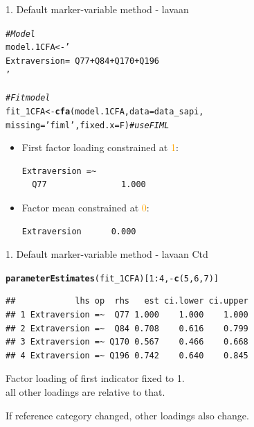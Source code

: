 \documentclass[10pt]{beamer}\usepackage[]{graphicx}\usepackage[]{xcolor}
\makeatletter
\newcommand{\hlnum}[1]{\textcolor[rgb]{0.686,0.059,0.569}{#1}}%
\newcommand{\hlstr}[1]{\textcolor[rgb]{0.192,0.494,0.8}{#1}}%
\newcommand{\hlcom}[1]{\textcolor[rgb]{0.678,0.584,0.686}{\textit{#1}}}%
\newcommand{\hlopt}[1]{\textcolor[rgb]{0,0,0}{#1}}%
\newcommand{\hlstd}[1]{\textcolor[rgb]{0.345,0.345,0.345}{#1}}%
\newcommand{\hlkwb}[1]{\textcolor[rgb]{0.69,0.353,0.396}{#1}}%
\newcommand{\hlkwc}[1]{\textcolor[rgb]{0.333,0.667,0.333}{#1}}%
\newcommand{\hlkwd}[1]{\textcolor[rgb]{0.737,0.353,0.396}{\textbf{#1}}}%
\newenvironment{kframe}{%
 \def\at@end@of@kframe{}%
 \ifinner\ifhmode%
  \def\at@end@of@kframe{\end{minipage}}%
  \begin{minipage}{\columnwidth}%
 \fi\fi%
 \def\FrameCommand##1{\hskip\@totalleftmargin \hskip-\fboxsep
 \colorbox{shadecolor}{##1}\hskip-\fboxsep
     \hskip-\linewidth \hskip-\@totalleftmargin \hskip\columnwidth}%
 \MakeFramed {\advance\hsize-\width
   \@totalleftmargin\z@ \linewidth\hsize
   \@setminipage}}%
 {\par\unskip\endMakeFramed%
 \at@end@of@kframe}
\newenvironment{knitrout}{}{} %
\makeatother
\begin{document}
\begin{frame}[fragile]{1. Default marker-variable method - lavaan}

\begin{knitrout}
\color{fgcolor}\begin{kframe}
\begin{alltt}
\hlcom{# Model}
\hlstd{model.1CFA} \hlkwb{<-} \hlstr{'
 Extraversion =~ Q77 + Q84 + Q170 + Q196
'}

\hlcom{# Fit model}
\hlstd{fit_1CFA} \hlkwb{<-} \hlkwd{cfa}\hlstd{(model.1CFA,} \hlkwc{data}\hlstd{=data_sapi,}
                \hlkwc{missing}\hlstd{=}\hlstr{'fiml'}\hlstd{,} \hlkwc{fixed.x}\hlstd{=F)}  \hlcom{# use FIML}
\end{alltt}
\end{kframe}
\end{knitrout}

\begin{itemize}
    \item First factor loading constrained at \textcolor{orange}{1}:\\
\begin{verbatim}
Extraversion =~                                     
  Q77               1.000
\end{verbatim}
    \item Factor mean constrained at \textcolor{orange}{0}:\\
\begin{verbatim}
Extraversion      0.000
\end{verbatim}
\end{itemize} 

\end{frame}
%
\begin{frame}[fragile]{1. Default marker-variable method - lavaan Ctd}

\begin{knitrout}
\color{fgcolor}\begin{kframe}
\begin{alltt}
\hlkwd{parameterEstimates}\hlstd{(fit_1CFA)[}\hlnum{1}\hlopt{:}\hlnum{4}\hlstd{,}\hlopt{-}\hlkwd{c}\hlstd{(}\hlnum{5}\hlstd{,}\hlnum{6}\hlstd{,}\hlnum{7}\hlstd{)]}
\end{alltt}
\begin{verbatim}
##            lhs op  rhs   est ci.lower ci.upper
## 1 Extraversion =~  Q77 1.000    1.000    1.000
## 2 Extraversion =~  Q84 0.708    0.616    0.799
## 3 Extraversion =~ Q170 0.567    0.466    0.668
## 4 Extraversion =~ Q196 0.742    0.640    0.845
\end{verbatim}
\end{kframe}
\end{knitrout}

Factor loading of first indicator fixed to 1. \\
all other loadings are relative to that.

\vspace{5mm}

If reference category changed, other loadings also change. 

\end{frame}
\end{document}
